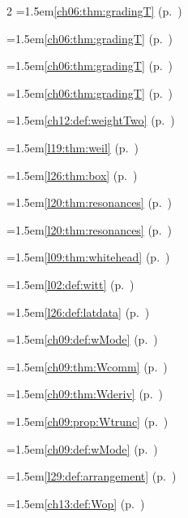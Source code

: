 \begin{multicols}{2}
\hangindent=1.5em\quad \ref{ch06:thm:gradingT} (p.~\pageref{ch06:thm:gradingT})\par
\hangindent=1.5em\quad \ref{ch06:thm:gradingT} (p.~\pageref{ch06:thm:gradingT})\par
\hangindent=1.5em\quad \ref{ch06:thm:gradingT} (p.~\pageref{ch06:thm:gradingT})\par
\hangindent=1.5em\quad \ref{ch06:thm:gradingT} (p.~\pageref{ch06:thm:gradingT})\par
\hangindent=1.5em\quad \ref{ch12:def:weightTwo} (p.~\pageref{ch12:def:weightTwo})\par
\hangindent=1.5em\quad \ref{l19:thm:weil} (p.~\pageref{l19:thm:weil})\par
\hangindent=1.5em\quad \ref{l26:thm:box} (p.~\pageref{l26:thm:box})\par
\hangindent=1.5em\quad \ref{l20:thm:resonances} (p.~\pageref{l20:thm:resonances})\par
\hangindent=1.5em\quad \ref{l20:thm:resonances} (p.~\pageref{l20:thm:resonances})\par
\hangindent=1.5em\quad \ref{l09:thm:whitehead} (p.~\pageref{l09:thm:whitehead})\par
\hangindent=1.5em\quad \ref{l02:def:witt} (p.~\pageref{l02:def:witt})\par
\hangindent=1.5em\quad \ref{l26:def:latdata} (p.~\pageref{l26:def:latdata})\par
\hangindent=1.5em\quad \ref{ch09:def:wMode} (p.~\pageref{ch09:def:wMode})\par
\hangindent=1.5em\quad \ref{ch09:thm:Wcomm} (p.~\pageref{ch09:thm:Wcomm})\par
\hangindent=1.5em\quad \ref{ch09:thm:Wderiv} (p.~\pageref{ch09:thm:Wderiv})\par
\hangindent=1.5em\quad \ref{ch09:prop:Wtrunc} (p.~\pageref{ch09:prop:Wtrunc})\par
\hangindent=1.5em\quad \ref{ch09:def:wMode} (p.~\pageref{ch09:def:wMode})\par
\hangindent=1.5em\quad \ref{l29:def:arrangement} (p.~\pageref{l29:def:arrangement})\par
\hangindent=1.5em\quad \ref{ch13:def:Wop} (p.~\pageref{ch13:def:Wop})\par

\end{multicols}
